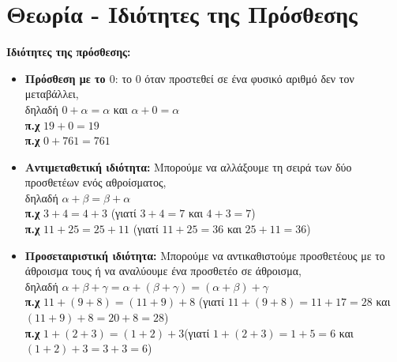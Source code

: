 \documentclass[a4paper,10pt]{report}
\begin{document}
\section*{Θεωρία - Ιδιότητες της Πρόσθεσης \hfill \small{}}
\textbf{Ιδιότητες της πρόσθεσης:}
\begin{itemize}
 \item \textbf{Πρόσθεση με το $0$}: το $0$ όταν προστεθεί σε ένα φυσικό αριθμό δεν τον μεταβάλλει,\\
        δηλαδή $0+α=α$ και $α+0=α$\\
        \textbf{π.χ} $19+0=19$\\
        \textbf{π.χ} $0+761=761$
 \item \textbf{Αντιμεταθετική ιδιότητα: } Μπορούμε να αλλάξουμε τη σειρά των δύο προσθετέων ενός αθροίσματος,\\
        δηλαδή $α+β=β+α$\\
       \textbf{π.χ} $3+4=4+3$ (γιατί $3+4=7$ και $4+3=7$)\\
       \textbf{π.χ} $11+25=25+11$ (γιατί $11+25=36$ και $25+11=36$)
 \item \textbf{Προσεταιριστική ιδιότητα:} Μπορούμε να αντικαθιστούμε προσθετέους με το άθροισμα τους ή να αναλύουμε 
       ένα προσθετέο σε άθροισμα,\\
       δηλαδή $α+β+γ=α+(β+γ)=(α+β)+γ$\\
       \textbf{π.χ} $11+(9+8)=(11+9)+8$ (γιατί $11+(9+8)=11+17=28$ και $(11+9)+8=20+8=28$)\\
       \textbf{π.χ} $1+(2+3)=(1+2)+3$(γιατί $1+(2+3)=1+5=6$ και $(1+2)+3=3+3=6$)
\end{itemize}
\end{document}
